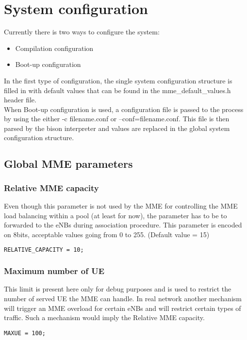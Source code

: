\documentclass[a4paper,oneside]{report}
\begin{document}
\chapter*{System configuration} 

Currently there is two ways to configure the system:
\begin{itemize}
 \item Compilation configuration
 \item Boot-up configuration
\end{itemize}
In the first type of configuration, the single system configuration structure
is filled in with default values that can be found in the mme\_default\_values.h
header file.\\
When Boot-up configuration is used, a configuration file is passed to the process
by using the either -c filename.conf or --conf=filename.conf. This file is then parsed
by the bison interpreter and values are replaced in the global system configuration
structure.

\section{Global MME parameters}

\subsection{Relative MME capacity}
Even though this parameter is not used by the MME for controlling the MME load
balancing within a pool (at least for now), the parameter has to be to forwarded
to the eNBs during association procedure.
This parameter is encoded on 8bits, acceptable values going from 0 to 255.
(Default value = 15)
\begin{lstlisting}
RELATIVE_CAPACITY = 10;
\end{lstlisting}

\subsection{Maximum number of UE}
\label{sec:Maximum number of UE}
This limit is present here only for debug purposes and is used to restrict
the number of served UE the MME can handle. In real network another mechanism
will trigger an MME overload for certain eNBs and will restrict certain types of
traffic. Such a mechanism would imply the Relative MME capacity.
\begin{lstlisting}
MAXUE = 100;
\end{lstlisting}
\end{document}
